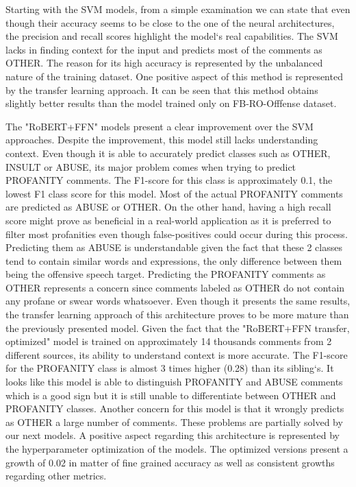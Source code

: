 \documentclass[12pt,a4paper]{report}
\begin{document}
Starting with the SVM models, from a simple examination we can state that even though their accuracy seems to be close to the one of the neural architectures, the precision and recall scores highlight the model`s real capabilities. The SVM lacks in finding context for the input and predicts most of the comments as OTHER. The reason for its high accuracy is represented by the unbalanced nature of the training dataset. One positive aspect of this method is represented by the transfer learning approach. It can be seen that this method obtains slightly better results than the model trained only on FB-RO-Offfense dataset.


The "RoBERT+FFN" models present a clear improvement over the SVM approaches. Despite the improvement, this model still lacks understanding context. Even though it is able to accurately predict classes such as OTHER, INSULT or ABUSE, its major problem comes when trying to predict PROFANITY comments. The F1-score for this class is approximately 0.1, the lowest F1 class score for this model. Most of the actual PROFANITY comments are predicted as ABUSE or OTHER.
On the other hand, having a high recall score might prove as beneficial in a real-world application as it is preferred to filter most profanities even though false-positives could occur during this process.
Predicting them as ABUSE is understandable given the fact that these 2 classes tend to contain similar words and expressions, the only difference between them being the offensive speech target. Predicting the PROFANITY comments as OTHER represents a concern since comments labeled as OTHER do not contain any profane or swear words whatsoever. 
Even though it presents the same results, the transfer learning approach of this architecture proves to be more mature than the previously presented model. Given the fact that the "RoBERT+FFN transfer, optimized" model is trained on approximately 14 thousands comments from 2 different sources, its ability to understand context is more accurate. 
The F1-score for the PROFANITY class is almost 3 times higher (0.28) than its sibling`s. It looks like this model is able to distinguish PROFANITY and ABUSE comments which is a good sign but it is still unable to differentiate between OTHER and PROFANITY classes. Another concern for this model is that it wrongly predicts as OTHER a large number of comments. These problems are partially solved by our next models. A positive aspect regarding this architecture is represented by the hyperparameter optimization of the models. The optimized versions present a growth of 0.02 in matter of fine grained accuracy as well as consistent growths regarding other metrics.
\end{document}

